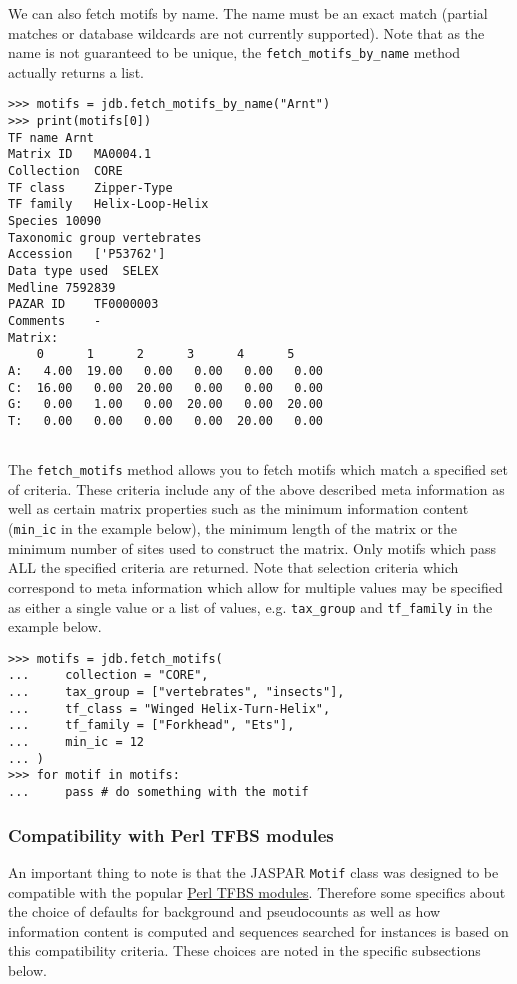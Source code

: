 We can also fetch motifs by name. The name must be an exact match (partial matches or database wildcards are not currently supported). Note that as the name is not guaranteed to be unique, the \verb+fetch_motifs_by_name+ method actually returns a list.
\begin{verbatim}
>>> motifs = jdb.fetch_motifs_by_name("Arnt")
>>> print(motifs[0])
TF name	Arnt
Matrix ID	MA0004.1
Collection	CORE
TF class	Zipper-Type
TF family	Helix-Loop-Helix
Species	10090
Taxonomic group	vertebrates
Accession	['P53762']
Data type used	SELEX
Medline	7592839
PAZAR ID	TF0000003
Comments	-
Matrix:
	0      1      2      3      4      5
A:   4.00  19.00   0.00   0.00   0.00   0.00
C:  16.00   0.00  20.00   0.00   0.00   0.00
G:   0.00   1.00   0.00  20.00   0.00  20.00
T:   0.00   0.00   0.00   0.00  20.00   0.00


\end{verbatim}

The \verb+fetch_motifs+ method allows you to fetch motifs which match a specified set of criteria. These criteria include any of the above described meta information as well as certain matrix properties such as the minimum information content (\verb+min_ic+ in the example below), the minimum length of the matrix or the minimum number of sites used to construct the matrix. Only motifs which pass ALL the specified criteria are returned. Note that selection criteria which correspond to meta information which allow for multiple values may be specified as either a single value or a list of values, e.g. \verb+tax_group+ and \verb+tf_family+ in the example below.
\begin{verbatim}
>>> motifs = jdb.fetch_motifs(
...     collection = "CORE",
...     tax_group = ["vertebrates", "insects"],
...     tf_class = "Winged Helix-Turn-Helix",
...     tf_family = ["Forkhead", "Ets"],
...     min_ic = 12
... )
>>> for motif in motifs:
...     pass # do something with the motif
\end{verbatim}

\subsubsection*{Compatibility with Perl TFBS modules}

An important thing to note is that the JASPAR \verb+Motif+ class was designed to be compatible with the popular \href{http://tfbs.genereg.net/}{Perl TFBS modules}. Therefore some specifics about the choice of defaults for background and pseudocounts as well as how information content is computed and sequences searched for instances is based on this compatibility criteria. These choices are noted in the specific subsections below.

